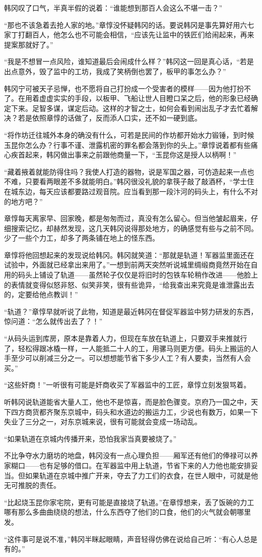 韩冈叹了口气，半真半假的说着：“谁能想到那百人会这么不堪一击？”

“那也不该急着去抢人家的地。”章惇没怀疑韩冈的话。要说韩冈是事先算好用六七家丁打翻百人，他怎么也不可能会相信，“应该先让监中的铁匠们给闹起来，再来提案那就好了。”

“我是不想冒一点风险，谁知道最后会闹成什么样？”韩冈这一回是真心话，“若是出点意外，毁了监中的工坊，我成了笑柄倒也罢了，板甲的事怎么办？”

韩冈宁可被天子忌惮，也不愿将自己打扮成一个受害者的模样——因为他打扮不了。在用着虚虚实实的手段，以板甲、飞船让世人目瞪口呆之后，他的形象已经确定下来。足智多谋，谋定后动。这样的才智之士，如何会看到闹出乱子才去忙着解决？若是依照章惇的话做了，反而添人口实，还不如一硬到底。

“将作坊迁往城外本身的确没有什么，可若是民间的作坊都开始水力锻锤，到时候玉昆你怎么办？行事不谨、泄露机密的罪名都会落到你的头上。”章惇说着都有些痛心疾首起来，韩冈做出事来之前跟他商量一下，“玉昆你这是授人以柄啊！”

“藏着掖着就能防得住吗？我使人打造的器物，说是军国之器，可仿造起来一点也不难，只要看两眼差不多就能明白。”韩冈很没礼貌的拿筷子敲了敲酒杯，“学士住在城东边，每天应该都要路过观音院。应当看到那一段汴河的码头上，有什么不对的地方吧？”

章惇每天离家早、回家晚，都是匆匆而过，真没有怎么留心。但当他皱起眉来，仔细搜索记忆，却赫然发现，这几天韩冈说得那处地方，的确感觉有些与之前不同。少了一些个力工，却多了两条铺在地上的怪东西。

章惇将他回想起来的发现说给韩冈。韩冈就笑道：“那就是轨道！军器监里面还在试验中，外面就已经拿出来用了。”一想到前两天突然听说城里绸缎商竟然开始在自用的码头上铺设了轨道——虽然轮子仅仅是将旧时的包铁车轮稍作改进——他脸上的表情就变得似怒非怒、似笑非笑，很有些诡异，“给我查出来究竟是谁泄露出去的，定要给他点教训！”

“轨道？”章惇早就听说了此物，知道是最近韩冈在督促军器监中努力研发的东西，惊问道：“怎么就传出去了？！”

“从码头运到库房，原本是靠着人力，但现在车放在轨道上，只要双手来推就行了，轻松得跟冰橇一样，一人能抵二十人的工，用骡马则更方便。码头上搬运的人手至少可以削减三分之一。可以想想能节省下多少人工？有人要卖，当然有人会买。”

“这些奸商！”一听很有可能是奸商收买了军器监中的工匠，章惇立刻发狠骂着。

听韩冈说轨道能省大量人工，他也不是惊喜，而是脸色骤变。京府乃一国之中，天下四方商货都齐聚东京城中，码头和水道边的搬运力工，少说也有数万，如果一下失业了三分之一，对东京城来说，很有可能就会变成一场动乱。

“如果轨道在京城内传播开来，恐怕我家当真要被烧了。”

不比争夺水力磨坊的地盘，韩冈没有一点心理负担——厢军还有他们的俸禄可以养家糊口——也有足够的借口。在军器监中用上轨道，节省下来的人力他也能安排妥当。但如果轨道在京城中推广开来，夺去了力工们的衣食，在世人眼中，可就是他无可推脱的责任。

“比起烧玉昆你家宅院，更有可能是直接烧了轨道。”在章惇想来，丢了饭碗的力工哪有那么多曲曲绕绕的想法，什么东西夺了他们的口食，他们的火气就会朝哪里发。

“这件事可是说不准，”韩冈半眯起眼睛，声音轻得仿佛在说给自己听：“有心人总是有的。”

